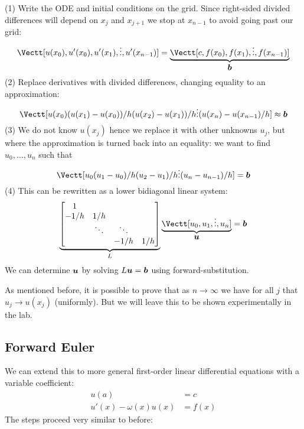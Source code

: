 (1) Write the ODE and initial conditions on the grid. Since right-sided divided differences will depend on $x_j$ and $x_{j+1}$ we stop at $x_{n-1}$ to avoid going past our grid: 
\[
\Vectt[u(x_0) , 
     u'(x_0) ,
u'(x_1) ,
\ensuremath{\vdots} ,
u'(x_{n-1})] = \underbrace{\Vectt[c, f(x_0), f(x_1), \ensuremath{\vdots} , f(x_{n-1})]}_{\ensuremath{\bm{\b}}}
\]
(2) Replace derivatives with divided differences, changing equality to an approximation:
\[
\Vectt[u(x_0) \\ 
(u(x_1) - u(x_0))/h \\
(u(x_2) - u(x_1))/h \\
\ensuremath{\vdots} \\
(u(x_n) - u(x_{n-1})/h] \ensuremath{\approx} \ensuremath{\bm{\b}}
\]
(3) We do not know $u(x_j)$ hence we replace it with other unknowns $u_j$, but where the approximation is turned back into an equality: we want to find $u_0,\ensuremath{\ldots},u_n$ such that
\[
\Vectt[u_0 \\ 
(u_1 - u_0)/h \\
(u_2 - u_1)/h \\
\ensuremath{\vdots} \\
(u_n - u_{n-1})/h] = \ensuremath{\bm{\b}}
\]
(4) This can be rewritten as a lower bidiagonal linear system:
\[
\underbrace{\begin{bmatrix}
    1 \\ 
    -1/h & 1/h \\
    & \ensuremath{\ddots} & \ensuremath{\ddots} \\
    && -1/h & 1/h \end{bmatrix}}_L \underbrace{\Vectt[u_0,u_1,\ensuremath{\vdots},u_n]}_{\ensuremath{\bm{\u}}} = \ensuremath{\bm{\b}}
\]
We can determine $\bm{{\mbox{\boldmath$u$\unboldmath}}}$ by solving $L \bm{{\mbox{\boldmath$u$\unboldmath}}} = \bm{{\mbox{\boldmath$b$\unboldmath}}}$ using forward-substitution.

As mentioned before, it is possible to prove that as $n \ensuremath{\rightarrow} \ensuremath{\infty}$ we have for all $j$ that $u_j \ensuremath{\rightarrow} u(x_j)$ (uniformly). But we will leave this to be shown experimentally in the lab.

\subsection{Forward Euler}
We can extend this to more general first-order linear differential equations with a variable coefficient:
\begin{align*}
u(a) &= c \\
u'(x) - \ensuremath{\omega}(x) u(x) &= f(x)
\end{align*}
The steps proceed very similar to before:

